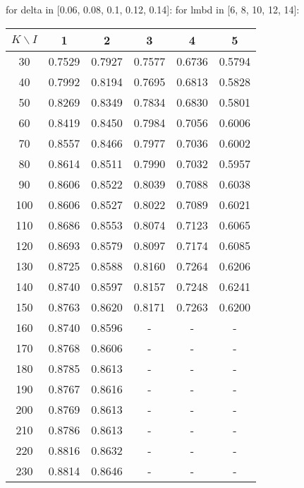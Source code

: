 \begin{table}[ht!]
            for delta in [0.06, 0.08, 0.1, 0.12, 0.14]:
                for lmbd in [6, 8, 10, 12, 14]:
        \label{tabular:wtmfg_test1}
        \begin{tabular}{|c|c|c|c|c|c|} \hline
            $K \backslash I$ & 1 & 2 & 3 & 4 & 5  \\ \hline
            30 & 0.7529 & 0.7927 & 0.7577 & 0.6736 & 0.5794  \\ \hline
            40 & 0.7992 & 0.8194 & 0.7695 & 0.6813 & 0.5828  \\ \hline
            50 & 0.8269 & 0.8349 & 0.7834 & 0.6830 & 0.5801  \\ \hline
            60 & 0.8419 & 0.8450 & 0.7984 & 0.7056 & 0.6006  \\ \hline
            70 & 0.8557 & 0.8466 & 0.7977 & 0.7036 & 0.6002  \\ \hline
            80 & 0.8614 & 0.8511 & 0.7990 & 0.7032 & 0.5957  \\ \hline
            90 & 0.8606 & 0.8522 & 0.8039 & 0.7088 & 0.6038  \\ \hline
            100 & 0.8606 & 0.8527 & 0.8022 & 0.7089 & 0.6021  \\ \hline
            110 & 0.8686 & 0.8553 & 0.8074 & 0.7123 & 0.6065  \\ \hline
            120 & 0.8693 & 0.8579 & 0.8097 & 0.7174 & 0.6085  \\ \hline
            130 & 0.8725 & 0.8588 & 0.8160 & 0.7264 & 0.6206  \\ \hline
            140 & 0.8740 & 0.8597 & 0.8157 & 0.7248 & 0.6241  \\ \hline
            150 & 0.8763 & 0.8620 & 0.8171 & 0.7263 & 0.6200  \\ \hline
            160 & 0.8740 & 0.8596 & - & - & - \\ \hline
            170 & 0.8768 & 0.8606 & - & - & -  \\ \hline
            180 & 0.8785 & 0.8613 & - & - & -  \\ \hline
            190 & 0.8767 & 0.8616 & - & - & -  \\ \hline
            200 & 0.8769 & 0.8613 & - & - & -  \\ \hline
            210 & 0.8786 & 0.8613 & - & - & -  \\ \hline
            220 & 0.8816 & 0.8632 & - & - & -  \\ \hline
            230 & 0.8814 & 0.8646 & - & - & -  \\ \hline


        \end{tabular}
    \end{table}





